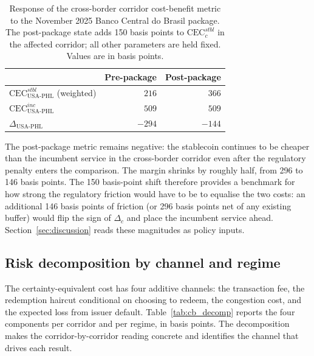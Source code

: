 \begin{table}[h]
\centering
\caption{Response of the cross-border corridor cost-benefit metric to the November 2025 Banco Central do Brasil package. The post-package state adds 150 basis points to $\mathrm{CEC}^{stbl}_c$ in the affected corridor; all other parameters are held fixed. Values are in basis points.}
\label{tab:cb_brazil}
\begin{tabular}{lrr}
\toprule
& Pre-package & Post-package \\
\midrule
$\mathrm{CEC}^{stbl}_{\text{USA-PHL}}$ (weighted) & $216$ & $366$ \\
$\mathrm{CEC}^{inc}_{\text{USA-PHL}}$ & $509$ & $509$ \\
$\Delta_{\text{USA-PHL}}$ & $-294$ & $-144$ \\
\bottomrule
\end{tabular}
\end{table}

The post-package metric remains negative: the stablecoin continues to be cheaper than the incumbent service in the cross-border corridor even after the regulatory penalty enters the comparison. The margin shrinks by roughly half, from 296 to 146 basis points. The 150 basis-point shift therefore provides a benchmark for how strong the regulatory friction would have to be to equalise the two costs: an additional 146 basis points of friction (or 296 basis points net of any existing buffer) would flip the sign of $\Delta_c$ and place the incumbent service ahead. Section~\ref{sec:discussion} reads these magnitudes as policy inputs.

\subsection{Risk decomposition by channel and regime}\label{sub:cb_decomposition}

The certainty-equivalent cost has four additive channels: the transaction fee, the redemption haircut conditional on choosing to redeem, the congestion cost, and the expected loss from issuer default. Table~\ref{tab:cb_decomp} reports the four components per corridor and per regime, in basis points. The decomposition makes the corridor-by-corridor reading concrete and identifies the channel that drives each result.

